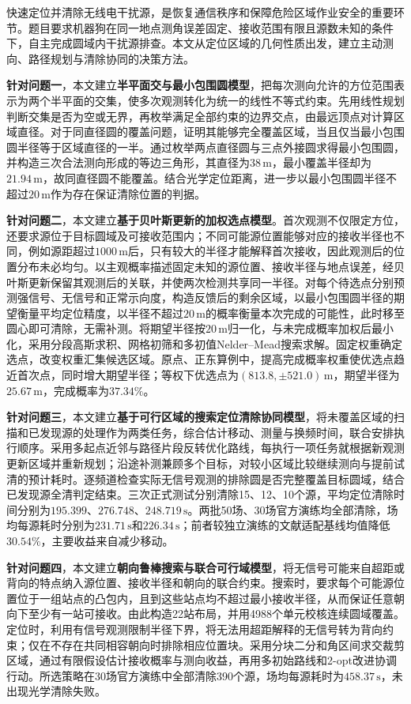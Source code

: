 快速定位并清除无线电干扰源，是恢复通信秩序和保障危险区域作业安全的重要环节。题目要求机器狗在同一地点测角误差固定、接收范围有限且源数未知的条件下，自主完成圆域内干扰源排查。本文从定位区域的几何性质出发，建立主动测向、路径规划与清除协同的决策方法。

\textbf{针对问题一}，本文建立\textbf{半平面交与最小包围圆模型}，把每次测向允许的方位范围表示为两个半平面的交集，使多次观测转化为统一的线性不等式约束。先用线性规划判断交集是否为空或无界，再枚举满足全部约束的边界交点，由最远顶点对计算区域直径。对于同直径圆的覆盖问题，证明其能够完全覆盖区域，当且仅当最小包围圆半径等于区域直径的一半。通过枚举两点直径圆与三点外接圆求得最小包围圆，并构造三次合法测向形成的等边三角形，其直径为\(38\,\mathrm{m}\)，最小覆盖半径却为\(21.94\,\mathrm{m}\)，故同直径圆不能覆盖。结合光学定位距离，进一步以最小包围圆半径不超过\(20\,\mathrm{m}\)作为存在保证清除位置的判据。

\textbf{针对问题二}，本文建立\textbf{基于贝叶斯更新的加权选点模型}。首次观测不仅限定方位，还要求源位于目标圆域及可接收范围内；不同可能源位置能够对应的接收半径也不同，例如源距超过\(1000\,\mathrm{m}\)后，只有较大的半径才能解释首次接收，因此观测后的位置分布未必均匀。以主观概率描述固定未知的源位置、接收半径与地点误差，经贝叶斯更新保留其观测后的关联，并使两次检测共享同一半径。对每个待选点分别预测强信号、无信号和正常示向度，构造反馈后的剩余区域，以最小包围圆半径的期望衡量平均定位精度，以半径不超过\(20\,\mathrm{m}\)的概率衡量本次完成的可能性，此时移至圆心即可清除，无需补测。将期望半径按\(20\,\mathrm{m}\)归一化，与未完成概率加权后最小化，采用分段高斯求积、网格初筛和多初值Nelder--Mead搜索求解。固定权重确定选点，改变权重汇集候选区域。原点、正东算例中，提高完成概率权重使优选点趋近首次点，同时增大期望半径；等权下优选点为\((813.8,\pm521.0)\,\mathrm{m}\)，期望半径为\(25.67\,\mathrm{m}\)，完成概率为\(37.34\%\)。

\textbf{针对问题三}，本文建立\textbf{基于可行区域的搜索定位清除协同模型}，将未覆盖区域的扫描和已发现源的处理作为两类任务，综合估计移动、测量与换频时间，联合安排执行顺序。采用多起点近邻与路径片段反转优化路线，每执行一项任务就根据新观测更新区域并重新规划；沿途补测兼顾多个目标，对较小区域比较继续测向与提前试清的预计耗时。逐频道检查实际无信号观测的排除圆是否完整覆盖目标圆域，结合已发现源全清判定结束。三次正式测试分别清除15、12、10个源，平均定位清除时间分别为\(195.399\)、\(276.748\)、\(248.719\,\mathrm{s}\)。两批50场、30场官方演练均全部清除，场均每源耗时分别为\(231.71\,\mathrm{s}\)和\(226.34\,\mathrm{s}\)；前者较独立演练的文献适配基线均值降低\(30.54\%\)，主要收益来自减少移动。

\textbf{针对问题四}，本文建立\textbf{朝向鲁棒搜索与联合可行域模型}，将无信号可能来自超距或背向的特点纳入源位置、接收半径和朝向的联合约束。搜索时，要求每个可能源位置位于一组站点的凸包内，且到这些站点均不超过最小接收半径，从而保证任意朝向下至少有一站可接收。由此构造22站布局，并用4988个单元校核连续圆域覆盖。定位时，利用有信号观测限制半径下界，将无法用超距解释的无信号转为背向约束；仅在不存在共同相容朝向时排除相应位置块。采用分块二分和角区间求交裁剪区域，通过有限假设估计接收概率与测向收益，再用多初始路线和2-opt改进协调行动。所选策略在30场官方演练中全部清除390个源，场均每源耗时为\(458.37\,\mathrm{s}\)，未出现光学清除失败。
